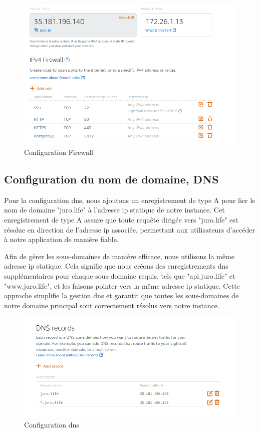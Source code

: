 \begin{figure}[H]
    \centering
    \includegraphics[width=15cm]{gfx/fig-firewall.png}
    \caption{Configuration Firewall}
    \label{fig:firewall}
\end{figure}

\subsection{Configuration du nom de domaine, DNS}

Pour la configuration \ac{dns}, nous ajoutons un enregistrement de type A pour lier le nom de domaine "juro.life" à l'adresse \ac{ip} statique de notre instance. Cet enregistrement de type A assure que toute requête dirigée vers "juro.life" est résolue en direction de l'adresse \ac{ip} associée, permettant aux utilisateurs d'accéder à notre application de manière fiable.

Afin de gérer les sous-domaines de manière efficace, nous utilisons la même adresse \ac{ip} statique. Cela signifie que nous créons des enregistrements \ac{dns} supplémentaires pour chaque sous-domaine requis, tels que "api.juro.life" et "www.juro.life", et les faisons pointer vers la même adresse \ac{ip} statique. Cette approche simplifie la gestion \ac{dns} et garantit que toutes les sous-domaines de notre domaine principal sont correctement résolus vers notre instance.

\begin{figure}[H]
    \centering
    \includegraphics[width=15cm]{gfx/fig-dns-record.png}
    \caption{Configuration \acf{dns}}
    \label{fig:dns}
\end{figure}

